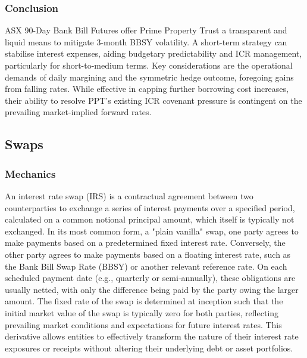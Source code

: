 \documentclass[11pt, a4paper, british]{article}
\begin{document}
\subsubsection{Conclusion}
ASX 90-Day Bank Bill Futures offer Prime Property Trust a transparent and liquid means to mitigate 3-month BBSY volatility. A short-term strategy can stabilise interest expenses, aiding budgetary predictability and ICR management, particularly for short-to-medium terms. Key considerations are the operational demands of daily margining and the symmetric hedge outcome, foregoing gains from falling rates. While effective in capping further borrowing cost increases, their ability to resolve PPT's existing ICR covenant pressure is contingent on the prevailing market-implied forward rates.

\newpage

\subsection{Swaps}

\subsubsection{Mechanics}
An interest rate swap (IRS) is a contractual agreement between two counterparties to exchange a series of interest payments over a specified period, calculated on a common notional principal amount, which itself is typically not exchanged. In its most common form, a "plain vanilla" swap, one party agrees to make payments based on a predetermined fixed interest rate. Conversely, the other party agrees to make payments based on a floating interest rate, such as the Bank Bill Swap Rate (BBSY) or another relevant reference rate. On each scheduled payment date (e.g., quarterly or semi-annually), these obligations are usually netted, with only the difference being paid by the party owing the larger amount. The fixed rate of the swap is determined at inception such that the initial market value of the swap is typically zero for both parties, reflecting prevailing market conditions and expectations for future interest rates. This derivative allows entities to effectively transform the nature of their interest rate exposures or receipts without altering their underlying debt or asset portfolios. 
\end{document}
